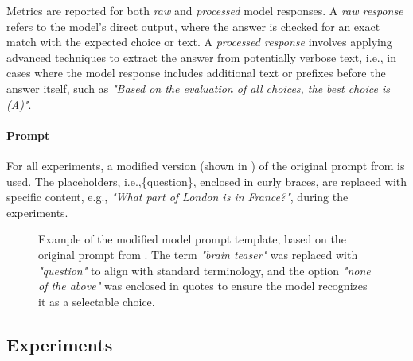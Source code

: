 Metrics are reported for both \textit{raw} and \textit{processed} model responses. A \textit{raw response} refers to the model's direct output, where the answer is checked for an exact match with the expected choice or text. A \textit{processed response} involves applying advanced techniques to extract the answer from potentially verbose text, i.e., in cases where the model response includes additional text or prefixes before the answer itself, such as \textit{"Based on the evaluation of all choices, the best choice is (A)"}.

\paragraph{Prompt}
For all experiments, a modified version (shown in ) of the original prompt from \textcite{jiangBRAINTEASERLateralThinking2023} is used. The placeholders, i.e.,\{question\}, enclosed in curly braces, are replaced with specific content, e.g., \textit{"What part of London is in France?"}, during the experiments.

\begin{figure}[htb]
  \centering
  \caption[Example of the modified model prompt template, based on the original prompt from \textcite{jiangBRAINTEASERLateralThinking2023}]{Example of the modified model prompt template, based on the original prompt from \textcite{jiangBRAINTEASERLateralThinking2023}. The term \textit{"brain teaser"} was replaced with \textit{"question"} to align with standard terminology, and the option \textit{"none of the above"} was enclosed in quotes to ensure the model recognizes it as a selectable choice.}
  \label{fig:prompt-template}
\end{figure}

\subsection{Experiments}

